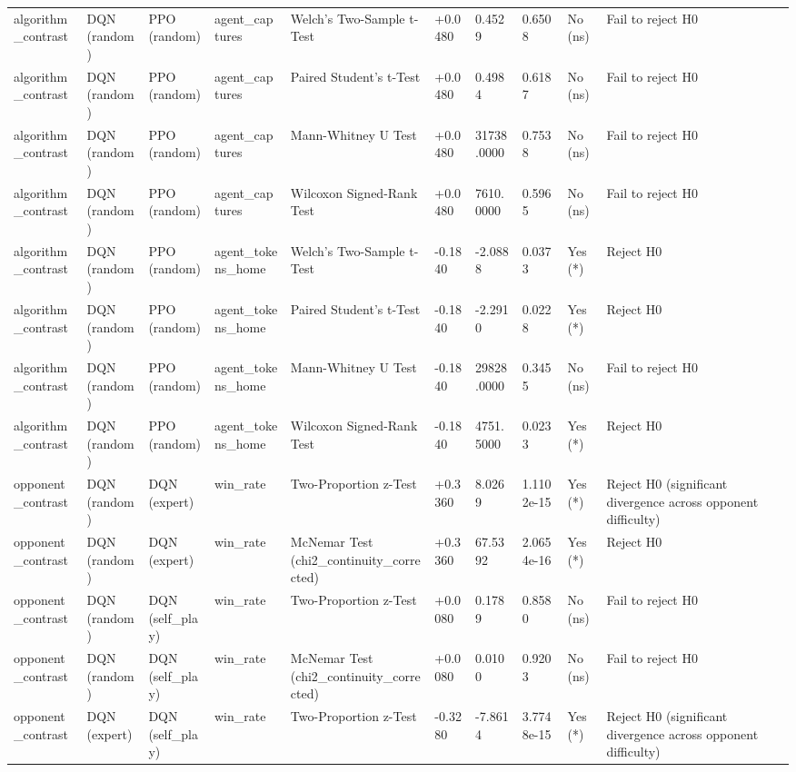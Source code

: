 \begin{table}
\begin{tabular}{llllllllll}
algorithm\_contrast & DQN (random) & PPO (random) & agent\_captures & Welch's Two-Sample t-Test & +0.0480 & 0.4529 & 0.6508 & No (ns) & Fail to reject H0 \\
algorithm\_contrast & DQN (random) & PPO (random) & agent\_captures & Paired Student's t-Test & +0.0480 & 0.4984 & 0.6187 & No (ns) & Fail to reject H0 \\
algorithm\_contrast & DQN (random) & PPO (random) & agent\_captures & Mann-Whitney U Test & +0.0480 & 31738.0000 & 0.7538 & No (ns) & Fail to reject H0 \\
algorithm\_contrast & DQN (random) & PPO (random) & agent\_captures & Wilcoxon Signed-Rank Test & +0.0480 & 7610.0000 & 0.5965 & No (ns) & Fail to reject H0 \\
algorithm\_contrast & DQN (random) & PPO (random) & agent\_tokens\_home & Welch's Two-Sample t-Test & -0.1840 & -2.0888 & 0.0373 & Yes (*) & Reject H0 \\
algorithm\_contrast & DQN (random) & PPO (random) & agent\_tokens\_home & Paired Student's t-Test & -0.1840 & -2.2910 & 0.0228 & Yes (*) & Reject H0 \\
algorithm\_contrast & DQN (random) & PPO (random) & agent\_tokens\_home & Mann-Whitney U Test & -0.1840 & 29828.0000 & 0.3455 & No (ns) & Fail to reject H0 \\
algorithm\_contrast & DQN (random) & PPO (random) & agent\_tokens\_home & Wilcoxon Signed-Rank Test & -0.1840 & 4751.5000 & 0.0233 & Yes (*) & Reject H0 \\
opponent\_contrast & DQN (random) & DQN (expert) & win\_rate & Two-Proportion z-Test & +0.3360 & 8.0269 & 1.1102e-15 & Yes (*) & Reject H0 (significant divergence across opponent difficulty) \\
opponent\_contrast & DQN (random) & DQN (expert) & win\_rate & McNemar Test (chi2\_continuity\_corrected) & +0.3360 & 67.5392 & 2.0654e-16 & Yes (*) & Reject H0 \\
opponent\_contrast & DQN (random) & DQN (self\_play) & win\_rate & Two-Proportion z-Test & +0.0080 & 0.1789 & 0.8580 & No (ns) & Fail to reject H0 \\
opponent\_contrast & DQN (random) & DQN (self\_play) & win\_rate & McNemar Test (chi2\_continuity\_corrected) & +0.0080 & 0.0100 & 0.9203 & No (ns) & Fail to reject H0 \\
opponent\_contrast & DQN (expert) & DQN (self\_play) & win\_rate & Two-Proportion z-Test & -0.3280 & -7.8614 & 3.7748e-15 & Yes (*) & Reject H0 (significant divergence across opponent difficulty) \\

\end{tabular}
\end{table}
